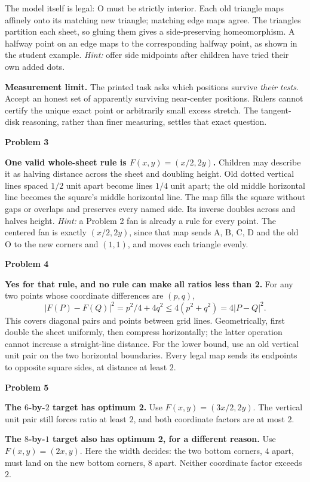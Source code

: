 \documentclass[11pt,letterpaper]{article}
\newcommand{\sect}[1]{\par\vspace{5pt}{\large\bfseries #1}\par}
\newcommand{\prob}[1]{\par\vspace{3pt}\textbf{Problem #1}\par}
\begin{document}
The model itself is legal: O must be strictly interior. Each old triangle maps
affinely onto its matching new triangle; matching edge maps agree. The triangles
partition each sheet, so gluing them gives a side-preserving homeomorphism.
A halfway point on an edge maps to the corresponding halfway point, as shown
in the student example. \textit{Hint:} offer side midpoints after children have
tried their own added dots.

\textbf{Measurement limit.} The printed task asks which positions survive
\emph{their tests}. Accept an honest set of apparently surviving near-center
positions. Rulers cannot certify the unique exact point or arbitrarily small
excess stretch. The tangent-disk reasoning, rather than finer measuring, settles
that exact question.

\prob{3}
\textbf{One valid whole-sheet rule is $F(x,y)=(x/2,2y)$.}
Children may describe it as halving distance across the sheet and doubling height.
Old dotted vertical lines spaced $1/2$ unit apart become lines $1/4$ unit apart;
the old middle horizontal line becomes the square's middle horizontal line.
The map fills the square without gaps or overlaps and preserves every named side.
Its inverse doubles across and halves height.
\textit{Hint:} a Problem 2 fan is already a rule for every point. The centered
fan is exactly $(x/2,2y)$, since that map sends A, B, C, D and the old O to the
new corners and $(1,1)$, and moves each triangle evenly.

\prob{4}
\textbf{Yes for that rule, and no rule can make all ratios less than 2.}
For any two points whose coordinate differences are $(p,q)$,
\[
 |F(P)-F(Q)|^2=p^2/4+4q^2\le4(p^2+q^2)=4|P-Q|^2.
\]
This covers diagonal pairs and points between grid lines. Geometrically, first
double the sheet uniformly, then compress horizontally; the latter operation
cannot increase a straight-line distance. For the lower bound, use an old
vertical unit pair on the two horizontal boundaries. Every legal map sends its
endpoints to opposite square sides, at distance at least $2$.
\sect{Changing the target}
\prob{5}
\textbf{The $6$-by-$2$ target has optimum 2.} Use
$F(x,y)=(3x/2,2y)$. The vertical unit pair still forces ratio at least $2$,
and both coordinate factors are at most $2$.

\textbf{The $8$-by-$1$ target also has optimum 2, for a different reason.} Use
$F(x,y)=(2x,y)$. Here the width decides: the two bottom corners, $4$ apart, must
land on the new bottom corners, $8$ apart. Neither coordinate factor exceeds $2$.
\end{document}
